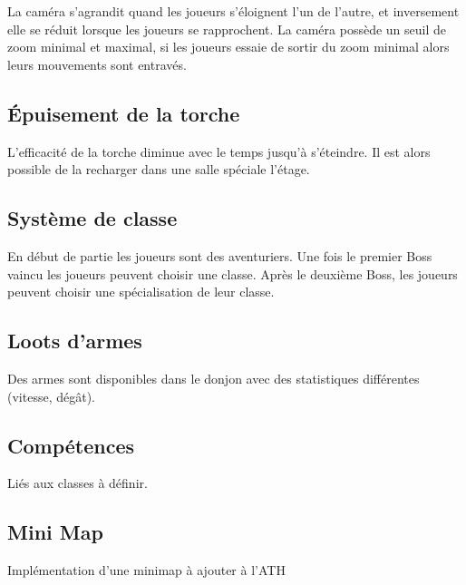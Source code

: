 La caméra s'agrandit quand les joueurs s'éloignent l'un de l'autre, et inversement elle se réduit lorsque les joueurs se rapprochent. La caméra possède un seuil de zoom minimal et maximal, si les joueurs essaie de sortir du zoom minimal alors leurs mouvements sont entravés.

\subsection*{Épuisement de la torche}

L'efficacité de la torche diminue avec le temps jusqu'à s'éteindre. Il est alors possible de la recharger dans une salle spéciale  l'étage.

\subsection*{Système de classe}

En début de partie les joueurs sont des aventuriers. Une fois le premier Boss vaincu les joueurs peuvent choisir une classe. Après le deuxième Boss, les joueurs peuvent choisir une spécialisation de leur classe.

\begin{center}
\end{center}

\subsection*{Loots d'armes}

Des armes sont disponibles dans le donjon avec des statistiques différentes (vitesse, dégât).

\subsection*{Compétences}

Liés aux classes à définir.

\subsection*{Mini Map}

Implémentation d'une minimap à ajouter à l'ATH


